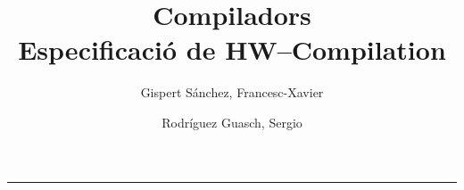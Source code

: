 \documentclass[a4paper,12pt,catalan]{article}
\begin{document}
\title{Compiladors\\ Especificació de HW--Compilation}  %

\author{Gispert Sánchez, Francesc-Xavier \and Rodríguez Guasch, Sergio}

\maketitle

\noindent \rule[0.5ex]{1\columnwidth}{1pt}

\tableofcontents

\clearpage




\clearpage



\clearpage



\clearpage



\clearpage



\clearpage


\nocite{*}
\printbibliography
{}
\end{document}

